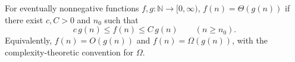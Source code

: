 
For eventually nonnegative functions $f,g:\mathbb N\to[0,\infty)$, $f(n)=\Theta(g(n))$ if there exist $c,C>0$ and $n_0$ such that
\[
c\,g(n)\le f(n)\le C\,g(n)\qquad(n\ge n_0).
\]
Equivalently, $f(n)=O(g(n))$ and $f(n)=\Omega(g(n))$, with the complexity-theoretic convention for $\Omega$.
